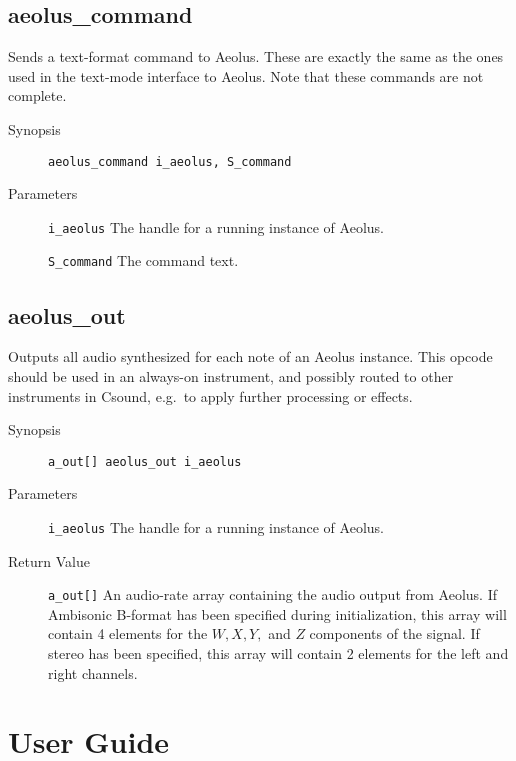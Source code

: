 \documentclass[english,11pt,letterpaper,onecolumn]{scrartcl}
\begin{document}
{\subsection*{aeolus\_command}

Sends a text-format command to Aeolus. These are exactly the same as the ones used in the text-mode interface to Aeolus. Note that these commands are not complete.

\begin{description}
	\item[Synopsis]
	\item[]\lstinline|aeolus_command i_aeolus, S_command|
	\item[Parameters]
	\item[]\lstinline|i_aeolus| The handle for a running instance of Aeolus.
	\item[]\lstinline|S_command| The command text.
\end{description}

\subsection*{aeolus\_out}

Outputs all audio synthesized for each note of an Aeolus instance. This opcode should be used in an always-on instrument, and possibly routed to other instruments in Csound, e.g.\ to apply further processing or effects.

\begin{description}
	\item[Synopsis]
	\item[]\lstinline|a_out[] aeolus_out i_aeolus|
	\item[Parameters]
	\item[]\lstinline|i_aeolus| The handle for a running instance of Aeolus.
	\item[Return Value]
	\item[]\lstinline|a_out[]| An audio-rate array containing the audio output from Aeolus. If Ambisonic B-format has been specified during initialization, this array will contain 4 elements for the $W, X, Y,$ and $Z$ components of the signal. If stereo has been specified, this array will contain 2 elements for the left and right channels.
\end{description}

\section{User Guide}

}
\end{document}
